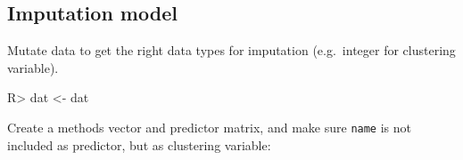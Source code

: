 \documentclass[
]{jss}
\begin{document}
\hypertarget{imputation-model}{%
\subsection{Imputation model}\label{imputation-model}}

Mutate data to get the right data types for imputation (e.g.~integer for
clustering variable).

\begin{CodeChunk}
\begin{CodeInput}
R> dat <- dat %
\end{CodeInput}
\end{CodeChunk}

Create a methods vector and predictor matrix, and make sure
\texttt{name} is not included as predictor, but as clustering variable:
\end{document}
